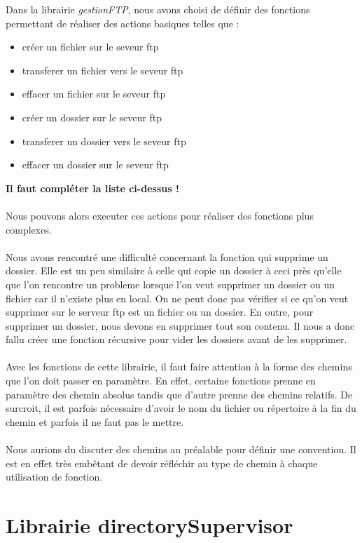 Dans la librairie \textit{gestionFTP}, nous avons choisi de définir des fonctions permettant de réaliser des actions basiques telles que : 
\begin{itemize}
\item créer un fichier sur le seveur ftp
\item transferer un fichier vers le seveur ftp
\item effacer un fichier sur le seveur ftp
\item créer un dossier sur le seveur ftp
\item transferer un dossier vers le seveur ftp
\item effacer un dossier sur le seveur ftp
\end{itemize}
\textbf{Il faut compléter la liste ci-dessus !} \\
\\
Nous pouvons alors executer ces actions pour réaliser des fonctions plus complexes.\\
\\
Nous avons rencontré une difficulté concernant la fonction qui supprime un dossier. 
Elle est un peu similaire à celle qui copie un dossier à ceci près qu'elle que l'on rencontre un probleme lorsque l'on
veut supprimer un dossier ou un fichier car il n'existe plus en local. On ne peut donc pas vérifier si ce 
qu'on veut supprimer sur le serveur ftp est un fichier ou un dossier. En outre, pour supprimer un dossier, nous devons en supprimer 
tout son contenu. Il nous a donc fallu créer une fonction récursive pour vider les dossiers avant de les supprimer.\\
\\
Avec les fonctions de cette librairie, il faut faire attention à la forme des chemins que l'on doit passer en paramètre. 
En effet, certaine fonctions prenne en paramètre des chemin absolus tandis que d'autre prenne des chemins relatifs. 
De surcroit, il est parfois nécessaire d'avoir le nom du fichier ou répertoire à la fin du chemin et parfois il ne faut pas le mettre.\\
\\
Nous aurions du discuter des chemins au préalable pour définir une convention. 
Il est en effet très embêtant de devoir réfléchir au type de chemin à chaque utilisation de fonction.


\section{Librairie directorySupervisor}

